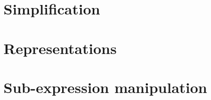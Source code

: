 \documentclass[11pt]{book}
\begin{document}



\section{Simplification}






\section{Representations}





\section{Sub-expression manipulation}





\printbibliography
\end{document}
